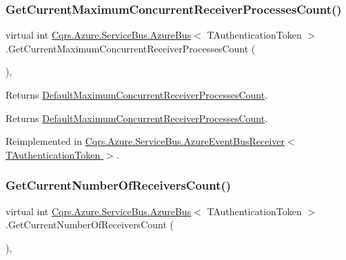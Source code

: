 \subsubsection{\texorpdfstring{Get\+Current\+Maximum\+Concurrent\+Receiver\+Processes\+Count()}{GetCurrentMaximumConcurrentReceiverProcessesCount()}}
{\footnotesize\ttfamily virtual int \hyperlink{classCqrs_1_1Azure_1_1ServiceBus_1_1AzureBus}{Cqrs.\+Azure.\+Service\+Bus.\+Azure\+Bus}$<$ T\+Authentication\+Token $>$.Get\+Current\+Maximum\+Concurrent\+Receiver\+Processes\+Count (\begin{DoxyParamCaption}{ }\end{DoxyParamCaption})\hspace{0.3cm}{\ttfamily [protected]}, {\ttfamily [virtual]}}



Returns \hyperlink{classCqrs_1_1Azure_1_1ServiceBus_1_1AzureBus_a12c3d07b7ad1836e85a449e6adc8b5df_a12c3d07b7ad1836e85a449e6adc8b5df}{Default\+Maximum\+Concurrent\+Receiver\+Processes\+Count}. 

\begin{DoxyReturn}{Returns}
\hyperlink{classCqrs_1_1Azure_1_1ServiceBus_1_1AzureBus_a12c3d07b7ad1836e85a449e6adc8b5df_a12c3d07b7ad1836e85a449e6adc8b5df}{Default\+Maximum\+Concurrent\+Receiver\+Processes\+Count}.
\end{DoxyReturn}


Reimplemented in \hyperlink{classCqrs_1_1Azure_1_1ServiceBus_1_1AzureEventBusReceiver_a4c16501e26662fc8bc15613eeb3673d7_a4c16501e26662fc8bc15613eeb3673d7}{Cqrs.\+Azure.\+Service\+Bus.\+Azure\+Event\+Bus\+Receiver$<$ T\+Authentication\+Token $>$}.

\mbox{\label{classCqrs_1_1Azure_1_1ServiceBus_1_1AzureBus_a8489f49aa20b972411e12465baa1bd14_a8489f49aa20b972411e12465baa1bd14}} 
\subsubsection{\texorpdfstring{Get\+Current\+Number\+Of\+Receivers\+Count()}{GetCurrentNumberOfReceiversCount()}}
{\footnotesize\ttfamily virtual int \hyperlink{classCqrs_1_1Azure_1_1ServiceBus_1_1AzureBus}{Cqrs.\+Azure.\+Service\+Bus.\+Azure\+Bus}$<$ T\+Authentication\+Token $>$.Get\+Current\+Number\+Of\+Receivers\+Count (\begin{DoxyParamCaption}{ }\end{DoxyParamCaption})\hspace{0.3cm}{\ttfamily [protected]}, {\ttfamily [virtual]}}



